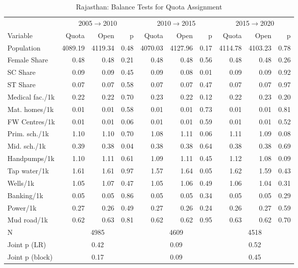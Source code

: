 \begin{table}[htbp]
\caption{Rajasthan: Balance Tests for Quota Assignment}
\label{tab:balance_raj_2005_2010}
{\centering\scriptsize
\begin{tabular}{@{}lrrr rrr rrr@{}}
\toprule
& \multicolumn{3}{c}{2005$\rightarrow$2010} & \multicolumn{3}{c}{2010$\rightarrow$2015} & \multicolumn{3}{c}{2015$\rightarrow$2020} \\
\cmidrule(lr){2-4} \cmidrule(lr){5-7} \cmidrule(lr){8-10}
Variable & Quota & Open & p & Quota & Open & p & Quota & Open & p \\
\midrule
Population & 4089.19 & 4119.34 & 0.48 & 4070.03 & 4127.96 & 0.17 & 4114.78 & 4103.23 & 0.78 \\
Female Share & 0.48 & 0.48 & 0.21 & 0.48 & 0.48 & 0.56 & 0.48 & 0.48 & 0.26 \\
SC Share & 0.09 & 0.09 & 0.45 & 0.09 & 0.08 & 0.01 & 0.09 & 0.09 & 0.92 \\
ST Share & 0.07 & 0.07 & 0.58 & 0.07 & 0.07 & 0.47 & 0.07 & 0.07 & 0.97 \\
Medical fac./1k & 0.22 & 0.22 & 0.70 & 0.23 & 0.22 & 0.12 & 0.22 & 0.23 & 0.20 \\
Mat. homes/1k & 0.01 & 0.01 & 0.58 & 0.01 & 0.01 & 0.73 & 0.01 & 0.01 & 0.81 \\
FW Centres/1k & 0.01 & 0.01 & 0.06 & 0.01 & 0.01 & 0.59 & 0.01 & 0.01 & 0.52 \\
Prim. sch./1k & 1.10 & 1.10 & 0.70 & 1.08 & 1.11 & 0.06 & 1.11 & 1.09 & 0.08 \\
Mid. sch./1k & 0.39 & 0.38 & 0.04 & 0.38 & 0.38 & 0.64 & 0.38 & 0.38 & 0.69 \\
Handpumps/1k & 1.10 & 1.11 & 0.61 & 1.09 & 1.11 & 0.45 & 1.12 & 1.08 & 0.09 \\
Tap water/1k & 1.61 & 1.61 & 0.97 & 1.57 & 1.64 & 0.05 & 1.62 & 1.59 & 0.43 \\
Wells/1k & 1.05 & 1.07 & 0.47 & 1.05 & 1.06 & 0.49 & 1.06 & 1.04 & 0.31 \\
Banking/1k & 0.05 & 0.05 & 0.86 & 0.05 & 0.05 & 0.34 & 0.05 & 0.05 & 0.29 \\
Power/1k & 0.27 & 0.26 & 0.49 & 0.27 & 0.26 & 0.24 & 0.26 & 0.27 & 0.59 \\
Mud road/1k & 0.62 & 0.63 & 0.81 & 0.62 & 0.62 & 0.95 & 0.63 & 0.62 & 0.70 \\
\midrule
N & \multicolumn{3}{c}{4985} & \multicolumn{3}{c}{4609} & \multicolumn{3}{c}{4518} \\
Joint p (LR) & \multicolumn{3}{c}{0.42} & \multicolumn{3}{c}{0.09} & \multicolumn{3}{c}{0.52} \\
Joint p (block) & \multicolumn{3}{c}{0.17} & \multicolumn{3}{c}{0.09} & \multicolumn{3}{c}{0.45} \\
\bottomrule
\end{tabular}
\par}


\end{table}
